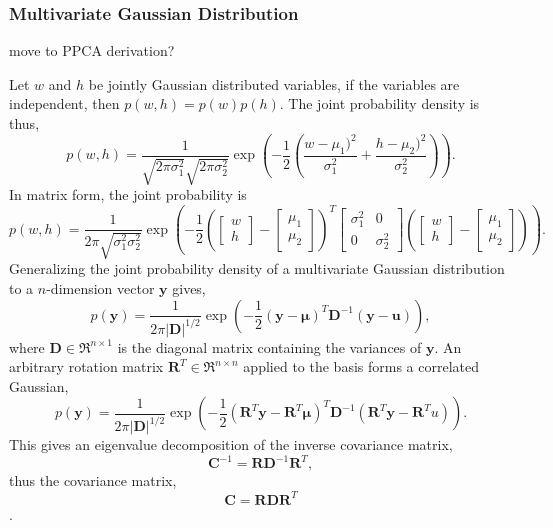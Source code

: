 \documentclass[ %
author={Dillon Keith Diep [INCOMPLETE DRAFT, NOT FOR SUBMISSION]},
supervisor={Dr. Carl Henrik Ek},
degree={MEng},
title={ARt-CG:},
subtitle={Assisted Real-time Content Generation of 3D Hair by Learning Manifolds},
type={Research},
year={2014} ]{dissertation}
\begin{document}
	
	\subsubsection{Multivariate Gaussian Distribution}
	{\color{red} move to PPCA derivation? }
	
	\noindent
	Let $w$ and $h$ be jointly Gaussian distributed variables, if the variables are independent, then $p(w,h)=p(w)p(h)$.
	The joint probability density is thus,
	$$p(w,h)=\frac{1}{\sqrt{2\pi\sigma^2_1}\sqrt{2\pi\sigma^2_2}}\exp\left(-\frac{1}{2}\left(\frac{w-\mu_1)^2}{\sigma^2_1}+\frac{h-\mu_2)^2}{\sigma^2_2}\right)\right).$$
	In matrix form, the joint probability is
	$$p(w,h)=\frac{1}{2\pi\sqrt{\sigma^2_1\sigma^2_2}}\exp
	\left(
	-\frac{1}{2}
	\left(
	\left[
	\begin{matrix}
	w \\
	h
	\end{matrix}
	\right]
	-
	\left[
	\begin{matrix}
	\mu_1 \\
	\mu_2
	\end{matrix}
	\right]
	\right)^T
	\left[
	\begin{matrix}
	\sigma^2_1  &   0\\
	0           &   \sigma^2_2
	\end{matrix}
	\right]
	\left(
	\left[
	\begin{matrix}
	w \\
	h
	\end{matrix}
	\right]
	-
	\left[
	\begin{matrix}
	\mu_1 \\
	\mu_2
	\end{matrix}
	\right]
	\right)
	\right).$$
	Generalizing the joint probability density of a multivariate Gaussian distribution to a $n$-dimension vector $\bm{y}$ gives,
	$$p(\bm{y})=\frac{1}{2\pi|\bm{D}|^{1/2}}\exp\left(-\frac{1}{2}(\bm{y}-\bm{\mu})^T\bm{D}^{-1}(\bm{y}-\bm{u})\right),$$
	where $\bm{D}\in\Re^{n \times 1}$ is the diagonal matrix containing the variances of $\bm{y}$.
	An arbitrary rotation matrix $\bm{R}^T\in\Re^{n \times n}$ applied to the basis forms a correlated Gaussian,
	$$p(\bm{y})=\frac{1}{2\pi|\bm{D}|^{1/2}}\exp\left(-\frac{1}{2}(\bm{R}^T\bm{y}-\bm{R}^T\bm{\mu})^T\bm{D}^{-1}(\bm{R}^T\bm{y}-\bm{R}^T{u})\right).$$
	This gives an eigenvalue decomposition of the inverse covariance matrix, 
	$$\bm{C}^{-1}=\bm{RD}^{-1}\bm{R}^T,$$
	thus the covariance matrix, 
	$$\bm{C}=\bm{RDR}^T$$.
	
\end{document}
